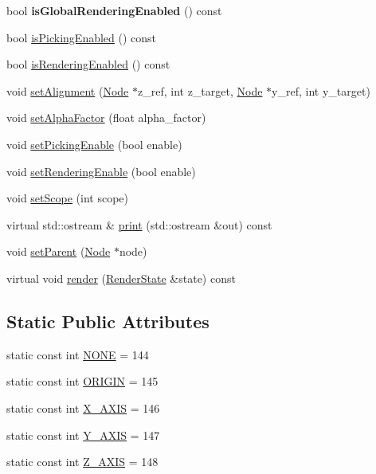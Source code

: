 \begin{CompactItemize}
\item 
\hypertarget{classm3g_1_1Node_bc8778e9f401f29218887ee117bee9b1}{
bool \textbf{isGlobalRenderingEnabled} () const }
\label{classm3g_1_1Node_bc8778e9f401f29218887ee117bee9b1}

\item 
bool \hyperlink{classm3g_1_1Node_b3187e5056afa4a94af03e34125c86b1}{isPickingEnabled} () const 
\item 
bool \hyperlink{classm3g_1_1Node_95020b155afed9552cc55377b09b1e86}{isRenderingEnabled} () const 
\item 
void \hyperlink{classm3g_1_1Node_dd1627aba90e63c166ecd3d7463d735a}{setAlignment} (\hyperlink{classm3g_1_1Node}{Node} $\ast$z\_\-ref, int z\_\-target, \hyperlink{classm3g_1_1Node}{Node} $\ast$y\_\-ref, int y\_\-target)
\item 
void \hyperlink{classm3g_1_1Node_b33c321ce240770e5eb64d0e20ea61cc}{setAlphaFactor} (float alpha\_\-factor)
\item 
void \hyperlink{classm3g_1_1Node_4f9296202713ac56ccae72d5e0c21d96}{setPickingEnable} (bool enable)
\item 
void \hyperlink{classm3g_1_1Node_58981ef7aea1bf0e630bcc065b2987e9}{setRenderingEnable} (bool enable)
\item 
void \hyperlink{classm3g_1_1Node_55f324f307a01705b9094a73af4ecd68}{setScope} (int scope)
\item 
virtual std::ostream \& \hyperlink{classm3g_1_1Node_6fea17fa1532df3794f8cb39cb4f911f}{print} (std::ostream \&out) const 
\item 
void \hyperlink{classm3g_1_1Node_880ecc7c1c091f7607eeae12ed100a9a}{setParent} (\hyperlink{classm3g_1_1Node}{Node} $\ast$node)
\item 
virtual void \hyperlink{classm3g_1_1Node_8babc8a79b78615da51161e94029eea9}{render} (\hyperlink{structm3g_1_1RenderState}{RenderState} \&state) const 
\end{CompactItemize}
\subsection*{Static Public Attributes}
\begin{CompactItemize}
\item 
static const int \hyperlink{classm3g_1_1Node_7b20f1b443e093d5ec5e990e73b47232}{NONE} = 144
\item 
static const int \hyperlink{classm3g_1_1Node_1b0d56eb173868ff472a6fd296c5bb6c}{ORIGIN} = 145
\item 
static const int \hyperlink{classm3g_1_1Node_dd4bccb7b9c652e726d58b06bd28dab2}{X\_\-AXIS} = 146
\item 
static const int \hyperlink{classm3g_1_1Node_3248ff73b5411ab0a66a38c451c8b6fe}{Y\_\-AXIS} = 147
\item 
static const int \hyperlink{classm3g_1_1Node_a928e648c9ae9b4706937831f77f0c67}{Z\_\-AXIS} = 148
\end{CompactItemize}


